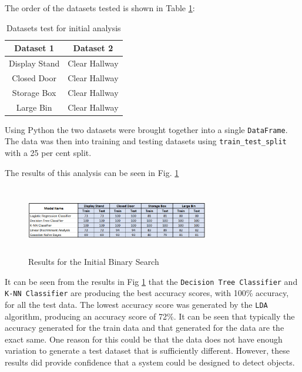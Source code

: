 \documentclass[conference]{IEEEtran}
\begin{document}
The order of the datasets tested is shown in Table \ref{table:2}:
\begin{table}[ht]
\centering
\begin{tabular}{||c c||} 
 \hline
 Dataset 1 & Dataset 2  \\ [0.5ex] 
 \hline\hline
 Display Stand & Clear Hallway  \\ 
 \hline
 Closed Door & Clear Hallway \\
 \hline
 Storage Box & Clear Hallway \\
 \hline
 Large Bin & Clear Hallway \\ [1ex] 
 \hline
\end{tabular}
\caption{Datasets test for initial analysis}
\label{table:2}
\end{table}

Using Python the two datasets were brought together into a single \texttt{DataFrame}. The data was then into training and testing datasets using \texttt{train\_test\_split} with a 25 per cent split.

The results of this analysis can be seen in Fig. \ref{fig:init_binary}
\begin{figure}[ht]
\includegraphics[width=8cm, height=3cm]{images/initial_binary_search.png}
\centering
\caption{Results for the Initial Binary Search}
\label{fig:init_binary}
\end{figure}

It can be seen from the results in Fig \ref{fig:init_binary} that the \texttt{Decision Tree Classifier} and \texttt{K-NN Classifier} are producing the best accuracy scores, with 100\% accuracy, for all the test data. The lowest accuracy score was generated by the \texttt{LDA} algorithm, producing an accuracy score of 72\%. It can be seen that typically the accuracy generated for the train data and that generated for the data are the exact same. One reason for this could be that the data does not have enough variation to generate a test dataset that is sufficiently different. However, these results did provide confidence that a system could be designed to detect objects. 
\end{document}
